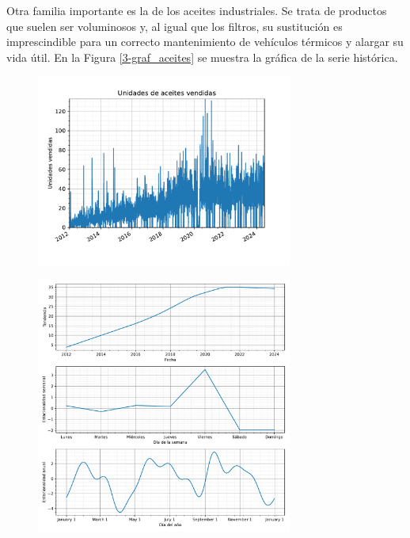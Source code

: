 Otra familia importante es la de los aceites industriales. Se trata de productos que suelen ser voluminosos y, al igual que los filtros, su sustitución es imprescindible para un correcto mantenimiento de vehículos térmicos y alargar su vida útil. En la Figura \ref*{3-graf_aceites} se muestra la gráfica de la serie histórica.

\begin{figure}[H]
	{\includegraphics[width=0.75\textwidth]{imagenes/grafica_aceites.pdf}}
\end{figure}



\begin{figure}[H]
	{\includegraphics[width=0.75\textwidth]{imagenes/comps_aceites.pdf}}
\end{figure}

